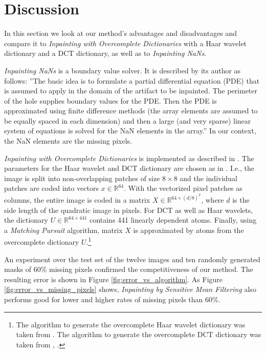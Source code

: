 \documentclass[10pt,conference,compsocconf]{IEEEtran}
\begin{document}
\section{Discussion}
\label{sec:discussion}
In this section we look at our method's advantages and disadvantages and compare it to \emph{Inpainting with Overcomplete Dictionaries} with a Haar wavelet dictionary and a DCT dictionary, as well as to \emph{Inpainting NaNs}.

\emph{Inpainting NaNs} is a boundary value solver. It is described by its author as follows\cite{john06}: ''The basic idea is to formulate a partial differential equation (PDE) that is assumed to apply in the domain of the artifact to be inpainted. The perimeter of the hole supplies boundary values for the PDE. Then the PDE is approximated using finite difference methods (the array elements are assumed to be equally spaced in each dimension) and then a large (and very sparse) linear system of equations is solved for the NaN elements in the array.'' In our context, the NaN elements are the missing pixels.
%
%


\emph{Inpainting with Overcomplete Dictionaries} is implemented as described in \cite{buhman11}. The parameters for the Haar wavelet and DCT dictionary are chosen as in \cite{aharon06}. I.e., the image is split into non-overlapping patches of size $8 \times 8$ and the individual patches are coded into vectors $x \in \mathbb{R}^{64}$. With the vectorized pixel patches as columns, the entire image is coded in a matrix $X \in \mathbb{R}^{64 \times (d/8)^2}$, where $d$ is the side length of the quadratic image in pixels. For DCT as well as Haar wavelets, the dictionary  $U \in \mathbb{R}^{64 \times 441}$ contains 441 linearly dependent atoms.  Finally, using a \emph{Matching Pursuit} algorithm, matrix $X$ is approximated by atoms from the overcomplete dictionary $U$.\footnote{The algorithm to generate the overcomplete Haar wavelet dictionary was taken from \cite{christen10}. The algorithm to generate the overcomplete DCT dictionary was taken from \cite{rubinstein09}, \cite{rubinstein09soft}.}

An experiment over the test set of the twelve images and ten randomly generated masks of $60\%$ missing pixels confirmed the competitiveness of our method. The resulting error is shown in Figure \ref{fig:error_vs_algorithm}. As Figure \ref{fig:error_vs_missing_pixels} shows, \emph{Inpainting by Sensitive Mean Filtering} also performs good for lower and higher rates of missing pixels than $60\%$.
\end{document}
